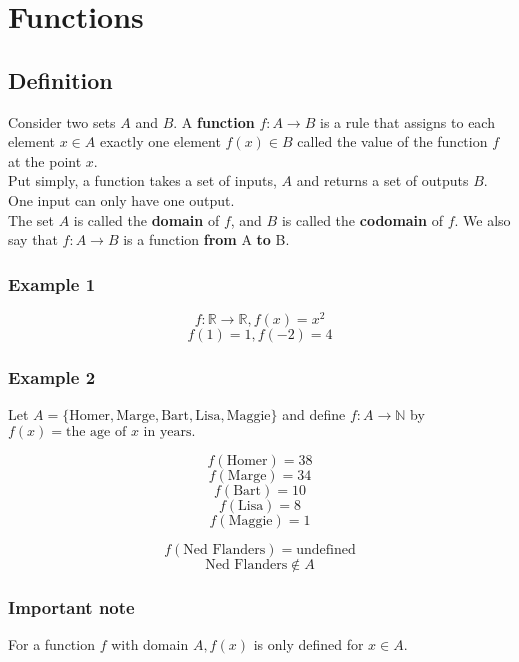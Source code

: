 \documentclass[11pt]{article}
\begin{document}
\section{Functions}
\label{sec:orgb6f0c41}

\subsection{Definition}
\label{sec:orgbe4c6c3}
Consider two sets \(A\) and \(B\). A \textbf{function} \(f : A \rightarrow B\) is a rule that assigns to each element \(x \in A\) exactly one element \(f(x) \in B\) called the value of the function \(f\) at the point \(x\).
\\[0pt]

Put simply, a function takes a set of inputs, \(A\) and returns a set of outputs \(B\). One input can only have one output.
\\[0pt]

The set \(A\) is called the \textbf{domain} of \(f\), and \(B\) is called the \textbf{codomain} of \(f\). We also say that \(f : A \rightarrow B\) is a function \textbf{from} A \textbf{to} B.
\\[0pt]

\subsubsection{Example 1}
\label{sec:orgc6f100b}

\[f : \mathbb{R} \rightarrow \mathbb{R}, f(x) = x^2\]
\[f(1) = 1, f(-2) = 4\]

\newpage

\subsubsection{Example 2}
\label{sec:org74e253a}

Let \(A = \{\text{Homer}, \text{Marge}, \text{Bart}, \text{Lisa}, \text{Maggie}\}\) and define \(f : A \rightarrow \mathbb{N}\) by \(f(x) = \text{the age of } x \text{ in years.}\)

\[f(\text{Homer}) = 38\]
\[f(\text{Marge}) = 34\]
\[f(\text{Bart}) = 10\]
\[f(\text{Lisa}) = 8\]
\[f(\text{Maggie}) = 1\]

\[f(\text{Ned Flanders}) = \text{undefined}\]
\[\text{Ned Flanders} \notin A\]


\subsubsection{Important note}
\label{sec:org2961329}
For a function \(f\) with domain \(A, f(x)\) is only defined for \(x \in A\).
\\[0pt]
\end{document}
